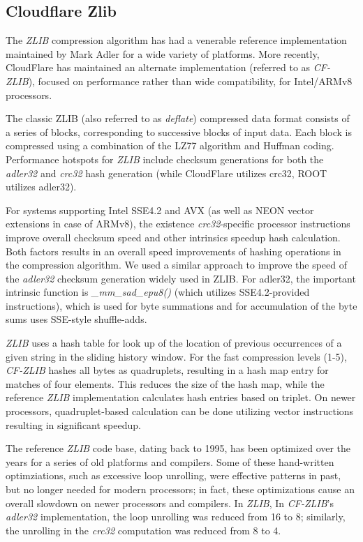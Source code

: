 \documentclass[12pt]{iopart}
\begin{document}
\subsection{Cloudflare Zlib}

The \textit{ZLIB} compression algorithm has had a venerable reference implementation maintained by Mark Adler for a wide variety of platforms.  More recently, CloudFlare \cite{zlib-cf} has maintained an alternate implementation (referred to as \textit{CF-ZLIB}), focused on performance rather than wide compatibility, for Intel/ARMv8 processors.

The classic ZLIB (also referred to as \textit{deflate}) compressed data format consists of a series of blocks, corresponding to successive blocks of input data. Each block is compressed using a combination of the LZ77 algorithm and Huffman coding. Performance hotspots for \textit{ZLIB} include checksum generations for both the \textit{adler32} and \textit{crc32} hash generation (while CloudFlare utilizes crc32, ROOT utilizes adler32).
 
For systems supporting Intel SSE4.2 and AVX (as well as NEON vector extensions in case of ARMv8), the existence \textit{crc32}-specific processor instructions improve overall checksum speed and other intrinsics speedup hash calculation. Both factors results in an overall speed improvements of hashing operations in the compression algorithm.  We used a similar approach to improve the speed of the \textit{adler32} checksum generation widely used in ZLIB.  For adler32, the important intrinsic function is \textit{\_mm\_sad\_epu8()} (which utilizes SSE4.2-provided instructions), which is used for byte summations and for accumulation of the byte sums uses SSE-style shuffle-adds.
 
 \textit{ZLIB} uses a hash table for look up of the location of previous occurrences of a given string in the sliding history window. For the fast compression levels (1-5), \textit{CF-ZLIB} hashes all bytes as quadruplets, resulting in a hash map entry for matches of four elements. This reduces the size of the hash map, while the reference \textit{ZLIB} implementation calculates hash entries based on triplet.  On newer processors, quadruplet-based calculation can be done utilizing vector instructions resulting in significant speedup.

The reference \textit{ZLIB} code base, dating back to 1995, has been optimized over the years for a series of old platforms and compilers. Some of these hand-written optimziations, such as excessive loop unrolling, were effective patterns in past, but no longer needed for modern processors; in fact, these optimizations cause an overall slowdown on newer processors and compilers. In \textit{ZLIB}, In \textit{CF-ZLIB}'s \textit{adler32} implementation, the loop unrolling was reduced from 16 to 8; similarly, the unrolling in the \textit{crc32} computation was reduced from 8 to 4.
 
\end{document}
